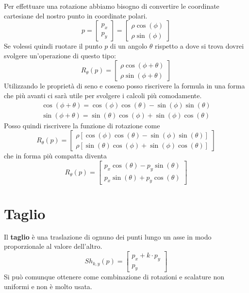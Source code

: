Per effettuare una rotazione abbiamo bisogno di convertire le coordinate cartesiane del nostro punto in coordinate
polari.
\[
	p = \begin{bmatrix}
		p_x \\ p_y
	\end{bmatrix} =
	\begin{bmatrix}
		\rho \cos(\phi) \\
		\rho \sin(\phi)
	\end{bmatrix}\]
Se volessi quindi ruotare il punto $p$ di un angolo $\theta$ rispetto a dove si trova
dovrei svolgere un'operazione di questo tipo:
\[
	R_\theta(p) =
	\begin{bmatrix}
		\rho \cos(\phi + \theta) \\
		\rho \sin(\phi + \theta)
	\end{bmatrix}
\]
Utilizzando le propriet\`a di seno e coseno posso riscrivere la formula in una forma che pi\`u avanti ci sar\`a utile
per svolgere i calcoli pi\`u comodamente.
\begin{gather*}
	\cos(\phi + \theta) = \cos(\phi) \cos(\theta) - \sin(\phi) \sin(\theta) \\
	\sin(\phi + \theta) = \sin(\theta) \cos(\phi) + \sin(\phi) \cos(\theta)
\end{gather*}
Posso quindi riscrivere la funzione di rotazione come
\[
	R_\theta(p) =
	\begin{bmatrix}
		\rho [ \cos(\phi) \cos(\theta) - \sin(\phi) \sin(\theta) ] \\
		\rho [ \sin(\theta) \cos(\phi) + \sin(\phi) \cos(\theta) ]
	\end{bmatrix}
\]
che in forma pi\`u compatta diventa
\[
	R_\theta(p) = \begin{bmatrix}
		p_x \cos(\theta) - p_y \sin(\theta) \\
		p_x \sin(\theta) + p_y \cos(\theta)
	\end{bmatrix}
\]

\section{Taglio}
Il \textbf{taglio} \`e una traslazione di ognuno dei punti lungo un asse in modo proporzionale al valore
dell'altro.
\[
	Sh_{k, y}(p) =
	\begin{bmatrix}
		p_x + k \cdot p_y \\
		p_y
	\end{bmatrix}
\]
Si pu\`o comunque ottenere come combinazione di rotazioni e scalature non uniformi e non \`e molto usata.

